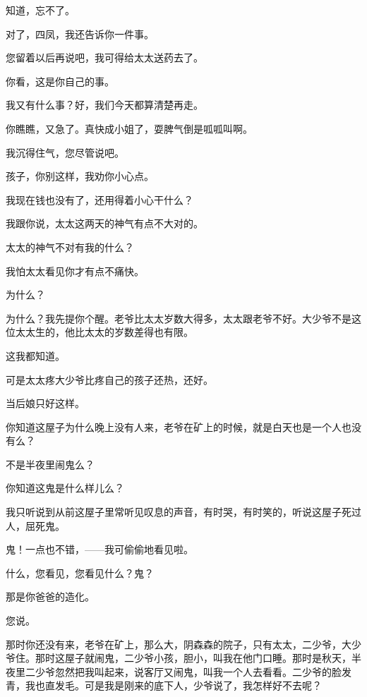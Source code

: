 知道，忘不了。

对了，四凤，我还告诉你一件事。

您留着以后再说吧，我可得给太太送药去了。

你看，这是你自己的事。

我又有什么事？好，我们今天都算清楚再走。

你瞧瞧，又急了。真快成小姐了，耍脾气倒是呱呱叫啊。

我沉得住气，您尽管说吧。

孩子，你别这样，我劝你小心点。

我现在钱也没有了，还用得着小心干什么？

我跟你说，太太这两天的神气有点不大对的。

太太的神气不对有我的什么？

我怕太太看见你才有点不痛快。

为什么？

为什么？我先提你个醒。老爷比太太岁数大得多，太太跟老爷不好。大少爷不是这位太太生的，他比太太的岁数差得也有限。

这我都知道。

可是太太疼大少爷比疼自己的孩子还热，还好。

当后娘只好这样。

你知道这屋子为什么晚上没有人来，老爷在矿上的时候，就是白天也是一个人也没有么？

不是半夜里闹鬼么？

你知道这鬼是什么样儿么？

我只听说到从前这屋子里常听见叹息的声音，有时哭，有时笑的，听说这屋子死过人，屈死鬼。

鬼！一点也不错，——我可偷偷地看见啦。

什么，您看见，您看见什么？鬼？

那是你爸爸的造化。

您说。

那时你还没有来，老爷在矿上，那么大，阴森森的院子，只有太太，二少爷，大少爷住。那时这屋子就闹鬼，二少爷小孩，胆小，叫我在他门口睡。那时是秋天，半夜里二少爷忽然把我叫起来，说客厅又闹鬼，叫我一个人去看看。二少爷的脸发青，我也直发毛。可是我是刚来的底下人，少爷说了，我怎样好不去呢？

